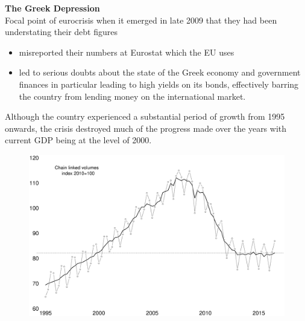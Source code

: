 \documentclass{beamer}
\begin{document}
\begin{frame}
  \textbf{The Greek Depression}\\
  Focal point of eurocrisis when it emerged in late 2009 that they had been understating their debt figures
  \begin{itemize}
    \item misreported their numbers at Eurostat which the EU uses
    \item led to serious doubts about the state of the Greek economy and government finances in particular leading to high yields on its bonds, effectively barring the country from lending money on the international market.
  \end{itemize}
  Although the country experienced a substantial period of growth from 1995 onwards, the crisis destroyed much of the progress made over the years with current GDP being at the level of 2000.
\end{frame}

\begin{frame}
  \begin{figure}
    \includegraphics[scale=.3]{greece1.eps}
  \end{figure}
\end{frame}
\end{document}
